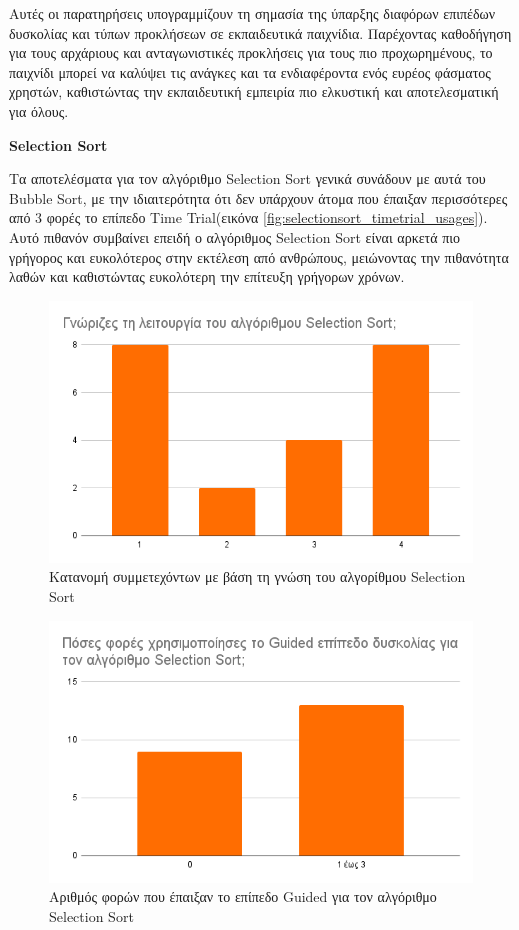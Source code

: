 Αυτές οι παρατηρήσεις υπογραμμίζουν τη σημασία της ύπαρξης διαφόρων επιπέδων δυσκολίας και τύπων προκλήσεων σε εκπαιδευτικά παιχνίδια. Παρέχοντας καθοδήγηση για τους αρχάριους και ανταγωνιστικές προκλήσεις για τους πιο προχωρημένους, το παιχνίδι μπορεί να καλύψει τις ανάγκες και τα ενδιαφέροντα ενός ευρέος φάσματος χρηστών, καθιστώντας την εκπαιδευτική εμπειρία πιο ελκυστική και αποτελεσματική για όλους.

\textbf{Selection Sort}

Τα αποτελέσματα για τον αλγόριθμο Selection Sort γενικά συνάδουν με αυτά του Bubble Sort, με την ιδιαιτερότητα ότι δεν υπάρχουν άτομα που έπαιξαν περισσότερες από 3 φορές το επίπεδο Time Trial(εικόνα \ref{fig:selectionsort_timetrial_usages}). Αυτό πιθανόν συμβαίνει επειδή ο αλγόριθμος Selection Sort είναι αρκετά πιο γρήγορος και ευκολότερος στην εκτέλεση από ανθρώπους, μειώνοντας την πιθανότητα λαθών και καθιστώντας ευκολότερη την επίτευξη γρήγορων χρόνων.

\begin{figure}[H]
    \centering
    \includegraphics[width=0.7\linewidth]{sections/5/2/images/did_you_know_the_functionality_of_selectionsort}
    \caption{Κατανομή συμμετεχόντων με βάση τη γνώση του αλγορίθμου Selection Sort}
    \label{fig:did_you_know_the_functionality_of_selectionsort}
\end{figure}

\begin{figure}[H]
    \centering
    \includegraphics[width=0.7\linewidth]{sections/5/2/images/selectionsort_guided_usages}
    \caption{Αριθμός φορών που έπαιξαν το επίπεδο Guided για τον αλγόριθμο Selection Sort}
    \label{fig:selectionsort_guided_usages}
\end{figure}

